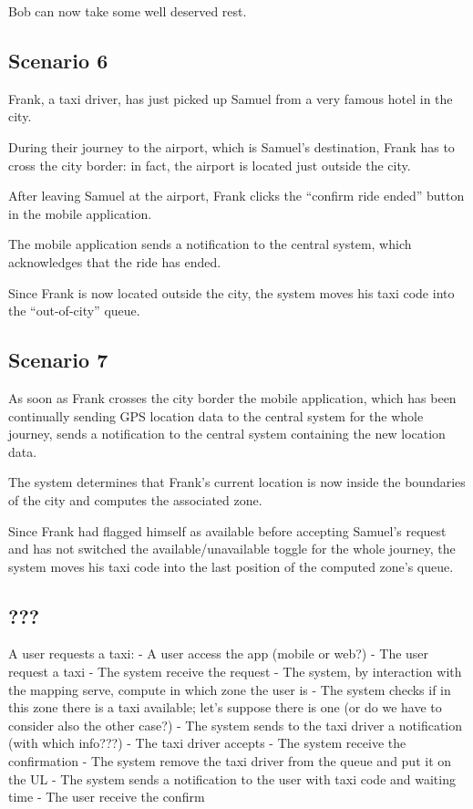 Bob can now take some well deserved rest.


\subsection{Scenario 6}
Frank, a taxi driver, has just picked up Samuel from a very famous hotel in the city.

During their journey to the airport, which is Samuel’s destination, Frank has to cross the city border: in fact, the airport is located just outside the city.

After leaving Samuel at the airport, Frank clicks the “confirm ride ended” button in the mobile application.

The mobile application sends a notification to the central system, which acknowledges that the ride has ended.

Since Frank is now located outside the city, the system moves his taxi code into the “out-of-city” queue.


\subsection{Scenario 7}
As soon as Frank crosses the city border the mobile application, which has been continually sending GPS location data to the central system for the whole journey, sends a notification to the central system containing the new location data.

The system determines that Frank’s current location is now inside the boundaries of the city and computes the associated zone.

Since Frank had flagged himself as available before accepting Samuel’s request and has not switched the available/unavailable toggle for the whole journey, the system moves his taxi code into the last position of the computed zone’s queue. 


\subsection{???}
A user requests a taxi:
- A user access the app (mobile or web?)
- The user request a taxi
- The system receive the request
- The system, by interaction with the mapping serve, compute in which zone the user is
- The system checks if in this zone there is a taxi available; let's suppose there is one (or do we have to consider also the other case?)
- The system sends to the taxi driver a notification (with which info???)
- The taxi driver accepts
- The system receive the confirmation
- The system remove the taxi driver from the queue and put it on the UL
- The system sends a notification to the user with taxi code and waiting time
- The user receive the confirm

